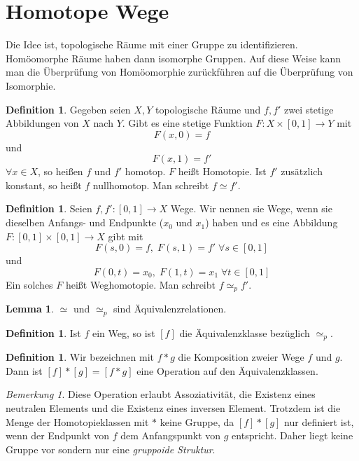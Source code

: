 \documentclass[a4paper, 12pt]{article}
\theoremstyle{plain}
\theoremstyle{definition}
\newtheorem{definition}[theorem]{Definition} %
\theoremstyle{lemma}
\newtheorem{lemma}[theorem]{Lemma}
\theoremstyle{remark}
\newtheorem{remark}[theorem]{Bemerkung}
\theoremstyle{corollary}
\theoremstyle{example}
\begin{document}
\section{Homotope Wege}
	Die Idee ist, topologische Räume mit einer Gruppe zu identifizieren. Homöomorphe Räume haben dann isomorphe Gruppen. Auf diese Weise kann man die Überprüfung von Homöomorphie zurückführen auf die Überprüfung von Isomorphie.
	\begin{definition}
		Gegeben seien $X,Y$ topologische Räume und $f,f'$ zwei stetige Abbildungen von $X$ nach $Y$. Gibt es eine stetige Funktion $F:X\times [0,1] \to Y$ mit \[F(x,0) = f\] und \[F(x,1) = f'\] $\forall x \in X$, so heißen $f$ und $f'$ homotop. $F$ heißt Homotopie. Ist $f'$ zusätzlich konstant, so heißt $f$ nullhomotop. Man schreibt $f\simeq f'$.
	\end{definition}
	\begin{definition}
		Seien $f,f': [0,1] \to X$ Wege. Wir nennen sie Wege, wenn sie dieselben Anfangs- und Endpunkte ($x_0$ und $x_1$) haben und es eine Abbildung $F: [0,1]\times [0,1] \to X$ gibt mit \[F(s,0) = f, \; F(s,1) = f' \; \forall s \in [0,1]\] und \[F(0,t) = x_0, \; F(1,t) = x_1 \; \forall t \in [0,1]\]
		Ein solches $F$ heißt Weghomotopie. Man schreibt $f \simeq_p f'$.
	\end{definition}
	\begin{lemma}
		$\simeq$ und $\simeq_p$ sind Äquivalenzrelationen.
	\end{lemma}
	\begin{definition}
		Ist $f$ ein Weg, so ist $[f]$ die Äquivalenzklasse bezüglich $\simeq_p$.
	\end{definition}
	\begin{definition}
		Wir bezeichnen mit $f*g$ die Komposition zweier Wege $f$ und $g$. Dann ist $[f]*[g] = [f*g]$ eine Operation auf den Äquivalenzklassen.
	\end{definition}
	\begin{remark}
		Diese Operation erlaubt Assoziativität, die Existenz eines neutralen Elements und die Existenz eines inversen Element. Trotzdem ist die Menge der Homotopieklassen mit $*$ keine Gruppe, da $[f]*[g]$ nur definiert ist, wenn der Endpunkt von $f$ dem Anfangspunkt von $g$ entspricht. Daher liegt keine Gruppe vor sondern nur eine \textit{gruppoide Struktur}.
	\end{remark}
\end{document}
